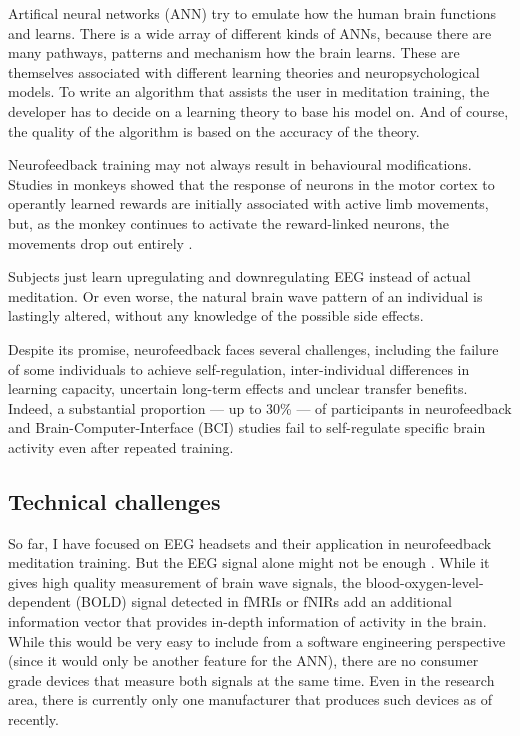 \documentclass{llncs} %
\begin{document}
Artifical neural networks (ANN) try to emulate how the human brain functions and learns. There is a wide array of different kinds of ANNs, because there are many pathways, patterns and mechanism how the brain learns. These are themselves associated with different learning theories and neuropsychological models. To write an algorithm that assists the user in meditation training, the developer has to decide on a learning theory to base his model on. And of course, the quality of the algorithm is based on the accuracy of the theory.
\medskip

Neurofeedback training may not always result in behavioural modifications. Studies in monkeys showed that the response of neurons in the motor cortex to operantly learned rewards are initially associated with active limb movements, but, as the monkey continues to activate the reward-linked neurons, the movements drop out entirely \cite{Sitaram}. 
\medskip

Subjects just learn upregulating and downregulating EEG instead of actual meditation. Or even worse, the natural brain wave pattern of an individual is lastingly altered, without any knowledge of the possible side effects. 
\medskip

Despite its promise, neurofeedback faces several challenges, including the failure of some individuals to achieve self-regulation, inter-individual differences in learning capacity, uncertain long-term effects and unclear transfer benefits. Indeed, a substantial proportion — up to 30\% — of participants in neurofeedback and Brain-Computer-Interface (BCI) studies fail to self-regulate specific brain activity even after repeated training.
\subsection{Technical challenges}

So far, I have focused on EEG headsets and their application in neurofeedback meditation training. But the EEG signal alone might not be enough \cite{Travis}. While it gives high quality measurement of brain wave signals, the blood-oxygen-level-dependent (BOLD) signal detected in fMRIs or fNIRs add an additional information vector that provides in-depth information of activity in the brain. While this would be very easy to include from a software engineering perspective (since it would only be another feature for the ANN), there are no consumer grade devices that measure both signals at the same time. Even in the research area, there is currently only one manufacturer that produces such devices as of recently. \cite{Sulzer}
\medskip
\end{document}
